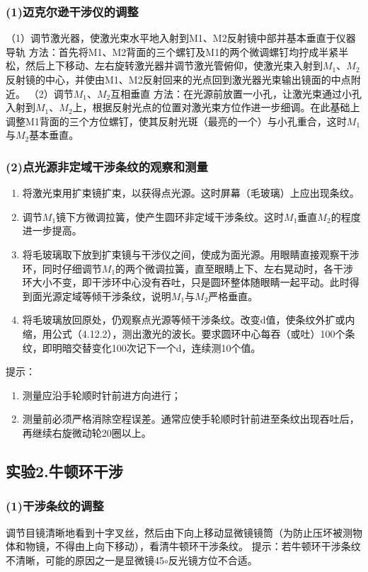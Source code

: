 \documentclass[11pt,a4paper,oneside]{article}
\begin{document}
\subsubsection*{(1)迈克尔逊干涉仪的调整}
（1）调节激光器，使激光束水平地入射到M1、M2反射镜中部并基本垂直于仪器导轨
方法：首先将M1、M2背面的三个螺钉及M1的两个微调螺钉均拧成半紧半松，然后上下移动、左右旋转激光器并调节激光管俯仰，使激光束入射到$M_1$、$M_2$反射镜的中心，并使由M1、M2反射回来的光点回到激光器光束输出镜面的中点附近。
（2）调节$M_1$、$M_2$互相垂直
方法：在光源前放置一小孔，让激光束通过小孔入射到$M_1$、$M_2$上，根据反射光点的位置对激光束方位作进一步细调。在此基础上调整M1背面的三个方位螺钉，使其反射光斑（最亮的一个）与小孔重合，这时$M_1$与$M_2$基本垂直。

\subsubsection*{(2)点光源非定域干涉条纹的观察和测量}
\begin{enumerate}
	\item 将激光束用扩束镜扩束，以获得点光源。这时屏幕（毛玻璃）上应出现条纹。
	\item 调节$M_1$镜下方微调拉簧，使产生圆环非定域干涉条纹。这时$M_1$垂直$M_2$的程度进一步提高。
	\item 将毛玻璃取下放到扩束镜与干涉仪之间，使成为面光源。用眼睛直接观察干涉环，同时仔细调节$M_1$的两个微调拉簧，直至眼睛上下、左右晃动时，各干涉环大小不变，即干涉环中心没有吞吐，只是圆环整体随眼睛一起平动。此时得到面光源定域等倾干涉条纹，说明$M_1$与$M_2$严格垂直。
	\item 将毛玻璃放回原处，仍观察点光源等倾干涉条纹。改变d值，使条纹外扩或内缩，用公式（4.12.2），测出激光的波长。要求圆环中心每吞（或吐）100个条纹，即明暗交替变化100次记下一个d，连续测10个值。
\end{enumerate}
提示：
\begin{enumerate}
\item 测量应沿手轮顺时针前进方向进行；
\item 测量前必须严格消除空程误差。通常应使手轮顺时针前进至条纹出现吞吐后，再继续右旋微动轮20圈以上。
\end{enumerate}

\subsection*{实验2.牛顿环干涉}
\subsubsection*{(1)干涉条纹的调整}
调节目镜清晰地看到十字叉丝，然后由下向上移动显微镜镜筒（为防止压坏被测物体和物镜，不得由上向下移动），看清牛顿环干涉条纹。
提示：若牛顿环干涉条纹不清晰，可能的原因之一是显微镜45$\circ$反光镜方位不合适。
\end{document}
